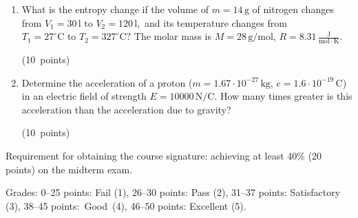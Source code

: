 \documentclass[12pt]{letter}
\begin{document}
\begin{enumerate}
\bigskip
\item  What is the entropy change if the volume of $ m = 14\,\mathrm{g} $ of nitrogen changes from $ V_1 = 30\,\mathrm{l} \text{\ to\ } V_2 = 120\,\mathrm{l},$ and its temperature changes from $T_1 = 27^\circ\mathrm{C} \text{\ to\ } T_2 = 327^\circ\mathrm{C}?$ The molar mass is $ M = 28\,\mathrm{g/mol}$, $R=8.31\,\mathrm{\frac{J}{mol\cdot K}}$. 

\medskip \hfill (10~points)


\bigskip
\item Determine the acceleration of a proton ($m = 1.67 \cdot 10^{-27}\,\mathrm{kg}$, $e=1.6\cdot 10^{-19}\,\mathrm{C}$) in an electric field of strength $ E = 10000\,\mathrm{N/C}. $ How many times greater is this acceleration than the acceleration due to gravity?

\medskip \hfill (10~points)

\end{enumerate}


Requirement for obtaining the course signature: achieving at least 40\% (20\,points) on the midterm exam.

Grades: 0--25 points: Fail (1), 26--30 points: Pass (2), 31--37 points: Satisfactory (3), 38--45 points:~Good~(4), 46--50 points: Excellent (5).


\vfill
\end{document}
